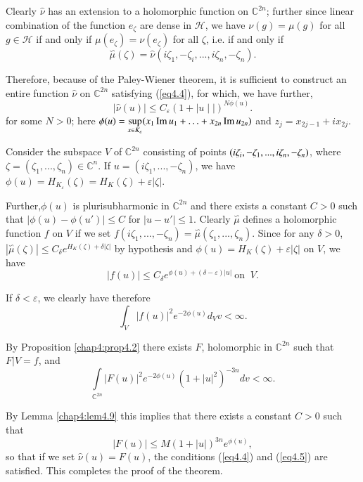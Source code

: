 Clearly  $\widehat{\nu}$ has an extension to a holomorphic
function on $\mathbb{C}^{2n}$; further since linear combination of the function
$e_\zeta$ are dense in $\mathscr{H}$, we have $\nu(g)=\mu(g)$
for all $g \in \mathscr{H}$ if and only if $\mu
(e_\zeta)=\nu (e_\zeta)$ for all $\zeta$, i.e. if and only if    
\begin{equation*} 
  \overset{\backsim}\mu (\zeta)= \widehat{\nu}(i \zeta_1, -
  \zeta_i,...,i\zeta_n,-\zeta_n). \tag{4.4}\label{eq4.4}
\end{equation*}

Therefore, because of the Paley-Wiener theorem, it is sufficient to
construct an entire function $\widehat{\nu}$ on $\mathbb{C}^{2n}$
satisfying (\ref{eq4.4}), for which, we have further, 
\begin{equation*}
  \mid \widehat{\nu} (u) \mid \leqslant C_\varepsilon (1+\mid u
  \mid|)^{N\phi (u)} . \tag{4.5} \label{eq4.5}
\end{equation*}
for some $N > 0$; here $\phi (u) = \sup\limits_{x \in K_\varepsilon}
(x_1 \operatorname{Im} u_1 + \ldots +  x_{2n} \operatorname{Im} u_{2n} )$ and $z_j = x_{2j-1} +
i x_{2j}$.

Consider the subspace $V$ of $\mathbb{C}^{2n}$ consisting of points $(i
\zeta_i, -\zeta_1,...,i\break \zeta_n ,-\zeta_n)$, where
$\zeta=(\zeta_1,...,\zeta_n)\in \mathbb{C}^{n}$. If
$u=(i\zeta_1,...,-\zeta_n)$, we have
$\phi(u) = H_{K_\varepsilon}(\zeta) = H_K (\zeta) + \varepsilon |\zeta|$.

Further,\pageoriginale $\phi(u)$ is plurisubharmonic in
$\mathbb{C}^{2n}$ and there exists 
a constant $C > 0$ such that  $|\phi(u) - \phi(u')|\leqslant C$  for
$|u-u'|\leqslant 1$. Clearly $\overset{\backsim}\mu$  
defines a holomorphic function $f$ on $V$ if we set 
$f(i\zeta_1,...,-\zeta_n)=\overset{\backsim}\mu(\zeta_1,...,\zeta_n)$. Since
for any $ \delta >0$, 
$|\overset{\backsim}\mu(\zeta)|\leqslant C_{\delta}
e^{H_K(\zeta)+\delta|\zeta|}$ by hypothesis and  $\phi(u) = H_K(\zeta) +
\varepsilon|\zeta|$  on $V$, we have
$$
|f(u)|\leqslant C_{\delta} e^{\phi(u)+(\delta-\varepsilon)|u|} ~ \text{
  on  } ~ V.
$$

If $\delta< \varepsilon$, we clearly have therefore
$$
\int_V|f(u)|^2 e^{-2 \phi (u)} d_V v< \infty.
$$

By Proposition \ref{chap4:prop4.2} there exists $F$, holomorphic in
$\mathbb{C}^{2n}$ such that  
$F|V=f$, and 
$$
\int\limits_{\mathbb{C}^{2n}} |F(u)|^2  e^{-2 \phi (u)} (1+|u|^2)^{-3n}
dv < \infty. 
$$

By Lemma \ref{chap4:lem4.9} this implies that there exists a constant
$C > 0$ such that  
$$ 
|F(u)| \leqslant M (1+|u|)^{3n} e^{\phi(u)},
$$
so that if we set $\widehat{\nu} (u) = F(u)$, the conditions
(\ref{eq4.4}) and (\ref{eq4.5}) are satisfied. This completes the
proof of the theorem. 



